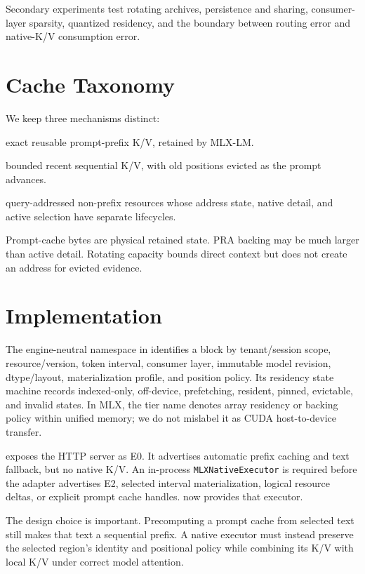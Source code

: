 \documentclass[10pt]{article}
\begin{document}
Secondary experiments test rotating archives, persistence and sharing,
consumer-layer sparsity, quantized residency, and the boundary between routing
error and native-K/V consumption error.

\section{Cache Taxonomy}
We keep three mechanisms distinct:
\begin{description}[leftmargin=2.4cm,style=nextline]
  \item[Prompt cache] exact reusable prompt-prefix K/V, retained by MLX-LM.
  \item[Rotating cache] bounded recent sequential K/V, with old positions
  evicted as the prompt advances.
  \item[PRA memory] query-addressed non-prefix resources whose address state,
  native detail, and active selection have separate lifecycles.
\end{description}
Prompt-cache bytes are physical retained state. PRA backing may be much larger
than active detail. Rotating capacity bounds direct context but does not create
an address for evicted evidence.

\section{Implementation}
The engine-neutral namespace in  identifies a
block by tenant/session scope, resource/version, token interval, consumer
layer, immutable model revision, dtype/layout, materialization profile, and
position policy. Its residency state machine records indexed-only, off-device,
prefetching, resident, pinned, evictable, and invalid states. In MLX, the tier
name denotes array residency or backing policy within unified memory; we do not
mislabel it as CUDA host-to-device transfer.

 exposes the HTTP server as E0. It advertises
automatic prefix caching and text fallback, but no native K/V. An in-process
\texttt{MLXNativeExecutor} is required before the adapter advertises E2,
selected interval materialization, logical resource deltas, or explicit prompt
cache handles.  now provides that executor.

The design choice is important. Precomputing a prompt cache from selected text
still makes that text a sequential prefix. A native executor must instead
preserve the selected region's identity and positional policy while combining
its K/V with local K/V under correct model attention.
\end{document}

